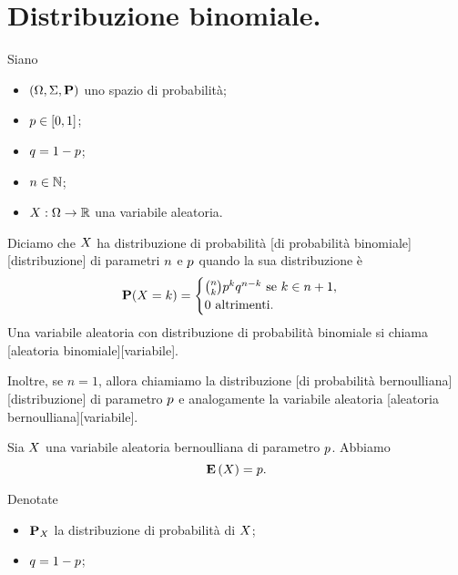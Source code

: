 \section{Distribuzione binomiale.}
\label{VariabiliAleatorieNotevoli_DistribuzioneBinomiale}
\begin{Definition}
  Siano
  \begin{itemize}
    \item $(\SamplesSpace,\Events,\Probability)$ uno spazio di probabilit\`a;
    \item $p \in [0,1]$;
    \item $q = 1 - p$;
    \item $n \in \mathbb{N}$;
    \item $X: \Omega \rightarrow \mathbb{R}$
      una variabile aleatoria.
  \end{itemize}
  Diciamo che $X$ ha distribuzione di probabilit\`a
  [di probabilit\`a binomiale][distribuzione]
  di parametri $n$ e $p$
  quando la sua distribuzione \`e
  \[
    \Probability(X = k) =
    \begin{cases}
      \binom{n}{k}
      \BernoulliProbability^k \BernoulliCoprobability^{n - k}\text{ se }
      k \in n + 1,\\
      0\text{ altrimenti}.
    \end{cases}
  \]
  Una variabile aleatoria con distribuzione di probabilit\`a binomiale si chiama
  [aleatoria binomiale][variabile].
  \par Inoltre, se $n = 1$, allora chiamiamo la distribuzione
  [di probabilit\`a bernoulliana][distribuzione]
  di parametro $p$ e analogamente la variabile aleatoria
  [aleatoria bernoulliana][variabile].
\end{Definition}
\begin{Theorem}
  Sia $X$ una variabile aleatoria bernoulliana di parametro
  $p$. Abbiamo
  \[
    \mathbf{E} \left ( X \right ) = p.
  \]
\end{Theorem}
\Proof Denotate
\begin{itemize}
  \item $\ProbabilityDistribution{\RandomVariable}$ la distribuzione di
probabilit\`a di $X$;
  \item $q = 1 - p$;
\end{itemize}
